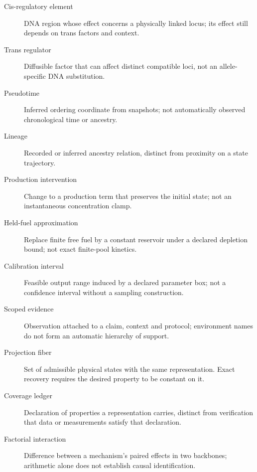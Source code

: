 \begin{description}
\item[Cis-regulatory element] DNA region whose effect concerns a physically linked locus; its effect still depends on trans factors and context.
\item[Trans regulator] Diffusible factor that can affect distinct compatible loci, not an allele-specific DNA substitution.
\item[Pseudotime] Inferred ordering coordinate from snapshots; not automatically observed chronological time or ancestry.
\item[Lineage] Recorded or inferred ancestry relation, distinct from proximity on a state trajectory.
\item[Production intervention] Change to a production term that preserves the initial state; not an instantaneous concentration clamp.
\item[Held-fuel approximation] Replace finite free fuel by a constant reservoir
under a declared depletion bound; not exact finite-pool kinetics.
\item[Calibration interval] Feasible output range induced by a declared parameter
box; not a confidence interval without a sampling construction.
\item[Scoped evidence] Observation attached to a claim, context and protocol;
environment names do not form an automatic hierarchy of support.
\item[Projection fiber] Set of admissible physical states with the same
representation. Exact recovery requires the desired property to be constant on it.
\item[Coverage ledger] Declaration of properties a representation carries,
distinct from verification that data or measurements satisfy that declaration.
\item[Factorial interaction] Difference between a mechanism's paired effects
in two backbones; arithmetic alone does not establish causal identification.
\end{description}
